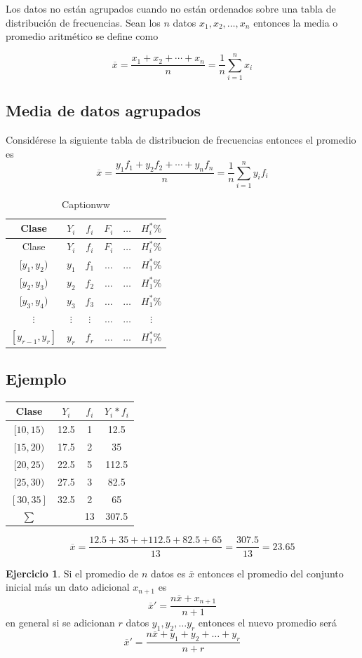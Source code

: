 \documentclass[10pt,]{krantz}
\theoremstyle{definition}
\theoremstyle{definition}
\theoremstyle{definition}
\newtheorem{exercise}{Ejercicio}[chapter]
\theoremstyle{definition}
\theoremstyle{remark}
\begin{document}
Los datos no están agrupados cuando no están ordenados sobre una tabla de distribución de frecuencias. Sean los \(n\) datos \(x_1, x_2, \ldots, x_n\) entonces la media o promedio aritmético se define como

\[ 
\overline{x}=\frac{x_1+x_2+\cdots+x_n}{n}=\frac{1}{n}\sum_{i=1}^nx_i 
\]

\hypertarget{media-de-datos-agrupados}{%
\subsection{Media de datos agrupados}\label{media-de-datos-agrupados}}

Considérese la siguiente tabla de distribucion de frecuencias entonces el promedio es \[\overline{x}=\frac{y_1f_1+y_2f_2+\cdots+y_nf_n}{n}=\frac{1}{n}\sum_{i=1}^ny_if_i\]

\begin{longtable}[]{@{}cccccc@{}}
\caption{\label{tab:www} Captionww}\tabularnewline
\toprule
Clase & \(Y_i\) & \(f_i\) & \(F_i\) & \(\ldots\) & \(H_i^*\%\)\tabularnewline
\midrule
\endfirsthead
\toprule
Clase & \(Y_i\) & \(f_i\) & \(F_i\) & \(\ldots\) & \(H_i^*\%\)\tabularnewline
\midrule
\endhead
\([y_1,y_2)\) & \(y_1\) & \(f_1\) & \(\ldots\) & \(\ldots\) & \(H_1^*\%\)\tabularnewline
\([y_2,y_3)\) & \(y_2\) & \(f_2\) & \(\ldots\) & \(\ldots\) & \(H_1^*\%\)\tabularnewline
\([y_3,y_4)\) & \(y_3\) & \(f_3\) & \(\ldots\) & \(\ldots\) & \(H_1^*\%\)\tabularnewline
\(\vdots\) & \(\vdots\) & \(\vdots\) & \(\ldots\) & \(\ldots\) & \(\vdots\)\tabularnewline
\([y_{r-1},y_r]\) & \(y_r\) & \(f_r\) & \(\ldots\) & \(\ldots\) & \(H_1^*\%\)\tabularnewline
\bottomrule
\end{longtable}

\hypertarget{ejemplo}{%
\subsection{Ejemplo}\label{ejemplo}}

\begin{longtable}[]{@{}cccc@{}}
\toprule
Clase & \(Y_i\) & \(f_i\) & \(Y_i*f_i\)\tabularnewline
\midrule
\endhead
\([10,15)\) & 12.5 & 1 & 12.5\tabularnewline
\([15,20)\) & 17.5 & 2 & 35\tabularnewline
\([20,25)\) & 22.5 & 5 & 112.5\tabularnewline
\([25,30)\) & 27.5 & 3 & 82.5\tabularnewline
\([30,35]\) & 32.5 & 2 & 65\tabularnewline
\(\sum\) & & 13 & 307.5\tabularnewline
\bottomrule
\end{longtable}

\[\overline{x}=\frac{12.5+35++112.5+82.5+65}{13}=\frac{307.5}{13}=23.65\]
\begin{exercise}
\protect\hypertarget{exr:unnamed-chunk-10}{}{\label{exr:unnamed-chunk-10} }Si el promedio de \(n\) datos es \(\overline{x}\) entonces el promedio del conjunto inicial más un dato adicional \(x_{n+1}\) es \[\overline{x}'=\frac{n\overline{x}+x_{n+1}}{n+1}\] en general si se adicionan \(r\) datos \(y_1, y_2, \ldots y_r\) entonces el nuevo promedio será \[\overline{x}'=\frac{n\overline{x}+y_{1}+y_2+\ldots+y_r}{n+r}\]
\end{exercise}
\end{document}
